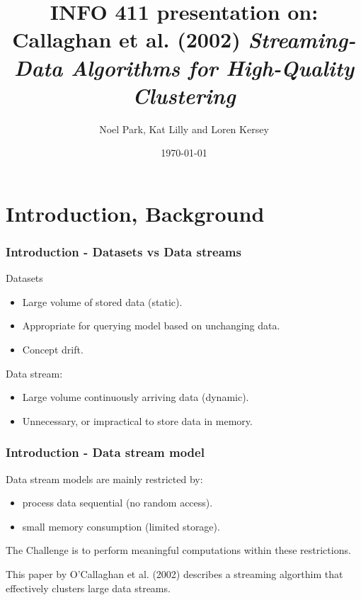 \documentclass{beamer}
\title{{\small INFO 411 presentation on:} \\ \bigskip Callaghan et
  al. (2002) {\em Streaming-Data Algorithms for High-Quality
    Clustering}} \author{Noel Park, Kat Lilly and Loren Kersey}
\date{\today}
\begin{document}
\frame{\titlepage}

\section[Outline]{}
\frame{\tableofcontents}

\section{Introduction, Background}

\frame
{
  \frametitle{Introduction - Datasets vs Data streams}

  Datasets
  \begin{itemize}
    \item Large volume of stored data (static).
    \item Appropriate for querying model based on unchanging data.
    \item Concept drift.
    \newline
  \end{itemize}

  Data stream:
  \begin{itemize}
    \item Large volume continuously arriving data (dynamic).
    \item Unnecessary, or impractical to store data in memory.
  \end{itemize}
}

\frame
{
  \frametitle{Introduction - Data stream model}

  Data stream models are mainly restricted by:
  \begin{itemize}
    \item process data sequential (no random access).
    \item small memory consumption (limited storage).
    \newline
  \end{itemize}

  The Challenge is to perform meaningful computations within these restrictions. \newline

  This paper by O'Callaghan et al. (2002) describes a streaming
  algorthim that effectively clusters large data streams.

}
\end{document}
